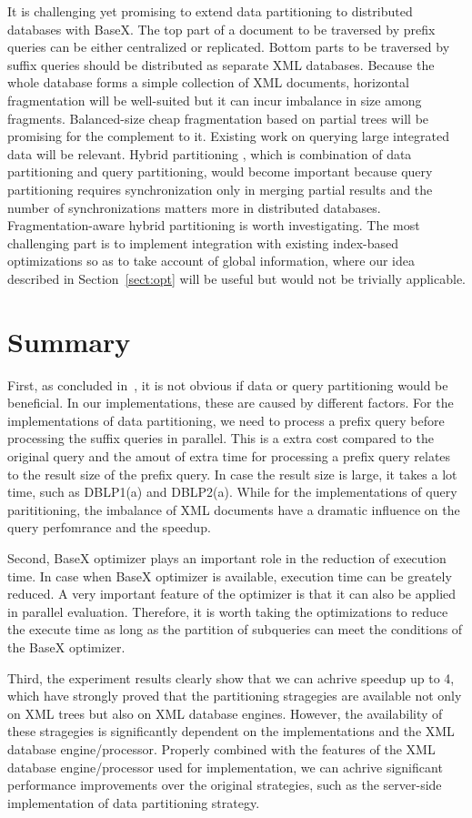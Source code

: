 It is challenging yet promising to extend data partitioning to distributed
databases with BaseX. The top part of a document to be traversed by prefix
queries can be either centralized or replicated. Bottom parts to be traversed by
suffix queries should be distributed as separate XML databases. Because the
whole database forms a simple collection of XML documents, horizontal
fragmentation \cite{kling11:dist_xml} will be well-suited but it can incur
imbalance in size among fragments. Balanced-size cheap fragmentation based on
partial trees \cite{HaMa16} will be promising for the complement to it. Existing
work \cite{DaGK14} on querying large integrated data will be relevant. Hybrid
partitioning \cite{BoLS09}, which is combination of data partitioning and query
partitioning, would become important because query partitioning requires
synchronization only in merging partial results and the number of
synchronizations matters more in distributed databases. Fragmentation-aware
hybrid partitioning is worth investigating. The most challenging part is to
implement integration with existing index-based optimizations so as to take
account of global information, where our idea described in
Section~\ref{sect:opt} will be useful but would not be trivially applicable.

\section{Summary}

First, as concluded in~\cite{BoLS09}, it is not obvious if data or query
partitioning would be beneficial. In our implementations, these are caused by
different factors. For the implementations of data partitioning, we need to
process a prefix query before processing the suffix queries in parallel. This is
a extra cost compared to the original query and the amout of extra time for
processing a prefix query relates to the result size of the prefix query. In
case the result size is large, it takes a lot time, such as DBLP1(a) and
DBLP2(a). While for the implementations of query parititioning, the imbalance of
XML documents have a dramatic influence on the query perfomrance and the
speedup.

Second, BaseX optimizer plays an important role in the reduction of execution
time. In case when BaseX optimizer is available, execution time can be greately
reduced. A very important feature of the optimizer is that it can also be
applied in parallel evaluation. Therefore, it is worth taking the optimizations
to reduce the execute time as long as the partition of subqueries can meet the
conditions of the BaseX optimizer.

Third, the experiment results clearly show that we can achrive speedup up to 4,
which have strongly proved that the partitioning stragegies are available not
only on XML trees but also on XML database engines. However, the availability of
these stragegies is significantly dependent on the implementations and the XML
database engine/processor. Properly combined with the features of the XML
database engine/processor used for implementation, we can achrive significant
performance improvements over the original strategies, such as the server-side
implementation of data partitioning strategy.
